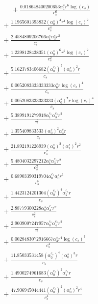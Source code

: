 \documentclass[10pt]{article}
\begin{document}
\begin{align*}
\phantom{R_{3,8}} &\phantom{={}}{}  + \frac{0.018648400200653 \alpha_{1}^s r^{6} \log{\left(c_{s} \right)}}{c_{s}^{6}} \\
&{}  + \frac{1.1965601393832 \left(\alpha_{0}^s\right)^{4} r^{4} \log{\left(c_{s} \right)}^{2}}{c_{s}^{4}} \\
&{}  + \frac{2.4584809206766 \alpha_{1}^s \alpha_{3}^s r^{2}}{c_{s}^{2}} \\
&{}  + \frac{1.2398128438351 \left(\alpha_{0}^s\right)^{6} r^{2} \log{\left(c_{s} \right)}^{2}}{c_{s}^{2}} \\
&{}  + \frac{5.1623783406682 \left(\alpha_{0}^{c_s}\right)^{5} \left(\alpha_{0}^s\right)^{2} r}{c_{s}} \\
&{}  + \frac{0.0052083333333333 \alpha_{6}^s r \log{\left(c_{s} \right)}^{4}}{c_{s}} \\
&{}  + \frac{0.0052083333333333 \left(\alpha_{0}^s\right)^{7} r \log{\left(c_{s} \right)}^{4}}{c_{s}} \\
&{}  + \frac{5.3899191279918 \alpha_{1}^{c_s} \alpha_{3}^{c_s} r^{2}}{c_{s}^{2}} \\
&{}  + \frac{1.355409833533 \left(\alpha_{0}^s\right)^{2} \alpha_{4}^s r}{c_{s}} \\
&{}  + \frac{21.892191226939 \left(\alpha_{0}^s\right)^{2} \left(\alpha_{1}^s\right)^{2} r^{2}}{c_{s}^{2}} \\
&{}  + \frac{5.4804032297212 \alpha_{1}^s \alpha_{3}^{c_s} r^{2}}{c_{s}^{2}} \\
&{}  + \frac{0.68903390319704 \alpha_{0}^{c_s} \alpha_{0}^s r^{6}}{c_{s}^{6}} \\
&{}  + \frac{1.4423124201304 \left(\alpha_{0}^{c_s}\right)^{4} \alpha_{2}^{c_s} r}{c_{s}} \\
&{}  + \frac{2.88779300228 \alpha_{0}^s \alpha_{4}^{c_s} r^{2}}{c_{s}^{2}} \\
&{}  + \frac{2.9009007247957 \alpha_{0}^{c_s} \alpha_{4}^{c_s} r^{2}}{c_{s}^{2}} \\
&{}  + \frac{0.0028483072916667 \alpha_{3}^s r^{4} \log{\left(c_{s} \right)}^{3}}{c_{s}^{4}} \\
&{}  + \frac{11.85033531458 \left(\alpha_{0}^{c_s}\right)^{4} \left(\alpha_{0}^s\right)^{3} r}{c_{s}} \\
&{}  + \frac{1.4900274961683 \left(\alpha_{0}^{c_s}\right)^{2} \alpha_{4}^{c_s} r}{c_{s}} \\
&{}  + \frac{47.906945044441 \left(\alpha_{0}^{c_s}\right)^{2} \left(\alpha_{0}^s\right)^{2} r^{4}}{c_{s}^{4}} \\

\end{align*}
\end{document}
